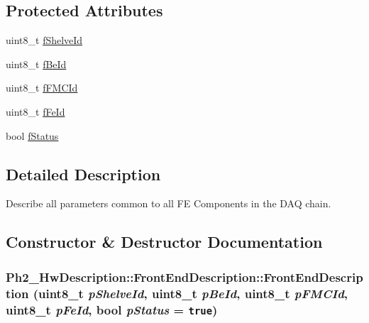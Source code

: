 \subsection*{Protected Attributes}
\begin{CompactItemize}
\item 
uint8\_\-t \hyperlink{class_ph2___hw_description_1_1_front_end_description_7ce5e0acdcb5647bb94f09ec480e8155}{f\-Shelve\-Id}
\item 
uint8\_\-t \hyperlink{class_ph2___hw_description_1_1_front_end_description_9ad4c11d4b00f0e1325843cfceac2e7c}{f\-Be\-Id}
\item 
uint8\_\-t \hyperlink{class_ph2___hw_description_1_1_front_end_description_4f17ee7ee9d0d395c9f7da5ab3c8f424}{f\-FMCId}
\item 
uint8\_\-t \hyperlink{class_ph2___hw_description_1_1_front_end_description_11b388f8d0f3259e5355779b36e75d9f}{f\-Fe\-Id}
\item 
bool \hyperlink{class_ph2___hw_description_1_1_front_end_description_719dce1ef5c6656fd71ae91f6f404053}{f\-Status}
\end{CompactItemize}


\subsection{Detailed Description}
Describe all parameters common to all FE Components in the DAQ chain. 



\subsection{Constructor \& Destructor Documentation}
\hypertarget{class_ph2___hw_description_1_1_front_end_description_9605f28b75ce29cba767fe6efb9d9d19}{
\subsubsection[FrontEndDescription]{\setlength{\rightskip}{0pt plus 5cm}Ph2\_\-Hw\-Description::Front\-End\-Description::Front\-End\-Description (uint8\_\-t {\em p\-Shelve\-Id}, uint8\_\-t {\em p\-Be\-Id}, uint8\_\-t {\em p\-FMCId}, uint8\_\-t {\em p\-Fe\-Id}, bool {\em p\-Status} = {\tt true})}}
\label{class_ph2___hw_description_1_1_front_end_description_9605f28b75ce29cba767fe6efb9d9d19}


